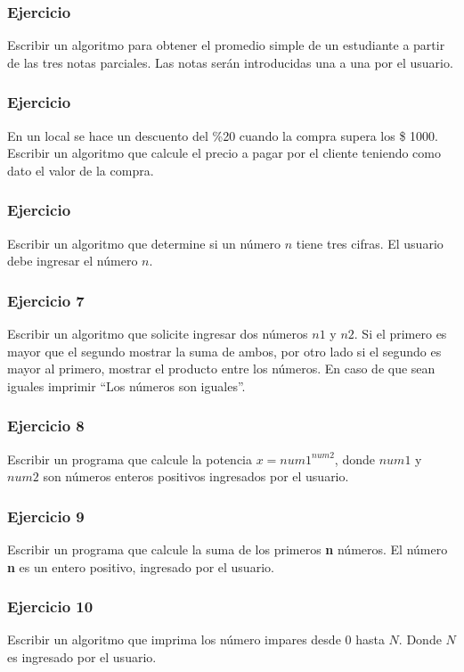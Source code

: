 \subsubsection{Ejercicio}
Escribir un algoritmo para obtener el promedio simple de un estudiante a partir de las tres notas parciales.
Las notas serán introducidas una a una por el usuario.

\subsubsection{Ejercicio}
En un local se hace un descuento del \%20 cuando la compra supera los \$ 1000. Escribir un algoritmo que calcule el precio a pagar por el cliente
teniendo como dato el valor de la compra.

\subsubsection{Ejercicio}
Escribir un algoritmo que determine si un número $n$ tiene tres cifras. El usuario debe ingresar el número $n$.

\subsubsection{Ejercicio 7}
Escribir un algoritmo que solicite ingresar dos números $n1$ y $n2$. Si el primero es mayor que el segundo mostrar la suma de ambos, por otro lado si el segundo es mayor al primero, mostrar el producto entre los números. En caso de que sean iguales imprimir ``Los números son iguales''.

\subsubsection{Ejercicio 8}
Escribir un programa que calcule la potencia $x={num1}^{num2}$, donde $num1$ y $num2$ son números enteros positivos ingresados por el usuario.

\subsubsection{Ejercicio 9}
Escribir un programa que calcule la suma de los primeros \textbf{n} números. El número \textbf{n} es un entero positivo, ingresado por el usuario.

\subsubsection{Ejercicio 10}
Escribir un algoritmo que imprima los número impares desde 0 hasta $N$. Donde $N$ es ingresado por el usuario.

